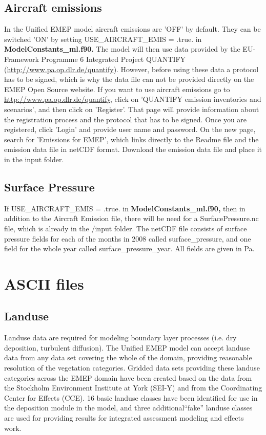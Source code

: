 \subsection{Aircraft emissions}
In the Unified EMEP model aircraft emissions are 'OFF' by default. 
They can be switched 'ON' by setting USE\_AIRCRAFT\_EMIS = .true. in { \bf ModelConstants\_ml.f90.} 
The model will then use data provided by the EU-Framework Programme 6 Integrated 
Project QUANTIFY (\url{http://www.pa.op.dlr.de/quantify}). However, before using 
these data a protocol has to be signed, which is why the data file can not be provided 
directly on the EMEP Open Source website. If you want to use aircraft emissions go to 
\url{http://www.pa.op.dlr.de/quantify}, click on 'QUANTIFY emission inventories and scenarios', 
and then click on 'Register'. That page will provide information about the registration 
process and the protocol that has to be signed. Once you are registered, click 'Login' and 
provide user name and password. On the new page, search for 'Emissions for EMEP', which 
links directly to the Readme file and the emission data file in netCDF format. Download the 
emission data file and place it in the input folder.

\subsection{Surface Pressure}

If USE\_AIRCRAFT\_EMIS = .true. in { \bf ModelConstants\_ml.f90,} then in addition to the Aircraft 
Emission file, there will be need for a SurfacePressure.nc file, which is already in the /input folder. 
The netCDF file consists of surface pressure fields for each of the months in 2008 called surface\_pressure, 
and one field for the whole year called surface\_pressure\_year. All fields are given in Pa. 

\section{ASCII files}

\subsection{Landuse}

Landuse data are required for modeling boundary layer processes
(i.e. dry deposition, turbulent diffusion).
The Unified EMEP model can accept landuse data from any
data set covering the whole of the domain, providing reasonable 
resolution of the vegetation categories. Gridded data sets providing
these landuse categories across the EMEP domain have been created
based on the data from the Stockholm Environment Institute at York 
(SEI-Y) and from the Coordinating Center for Effects (CCE). 
16 basic landuse classes have been identified for use in the
deposition module in the model, and three additional``fake'' landuse
classes are used for providing results for integrated assessment
modeling and effects work.

